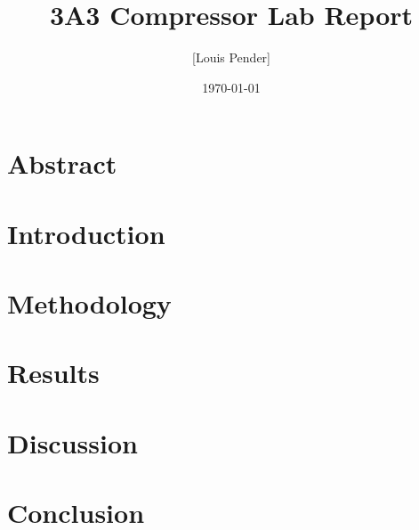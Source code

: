 \documentclass{article}
\title{3A3 Compressor Lab Report}
\author{[Louis Pender]}
\date{\today}
\begin{document}
\maketitle

\section{Abstract}

\section{Introduction}

\section{Methodology}

\section{Results}

\section{Discussion}

\section{Conclusion}
\end{document}
